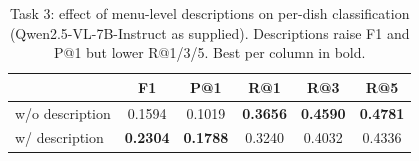 \begin{table}[tb]
  \centering
  \caption{Task 3: effect of menu-level descriptions on per-dish classification (Qwen2.5-VL-7B-Instruct as supplied).
  Descriptions raise F1 and P@1 but lower R@1/3/5. Best per column in bold.}
  \label{table:desc_guided}
  \small
  \begin{tabular}{@{}lccccc@{}}
    \toprule
                    & F1  & P@1 & R@1 & R@3 & R@5 \\
    \midrule
    w/o description & 0.1594 & 0.1019 & \textbf{0.3656} & \textbf{0.4590} & \textbf{0.4781} \\
    w/ description  & \textbf{0.2304} & \textbf{0.1788} & 0.3240 & 0.4032 & 0.4336 \\
    \bottomrule
  \end{tabular}
\end{table}
